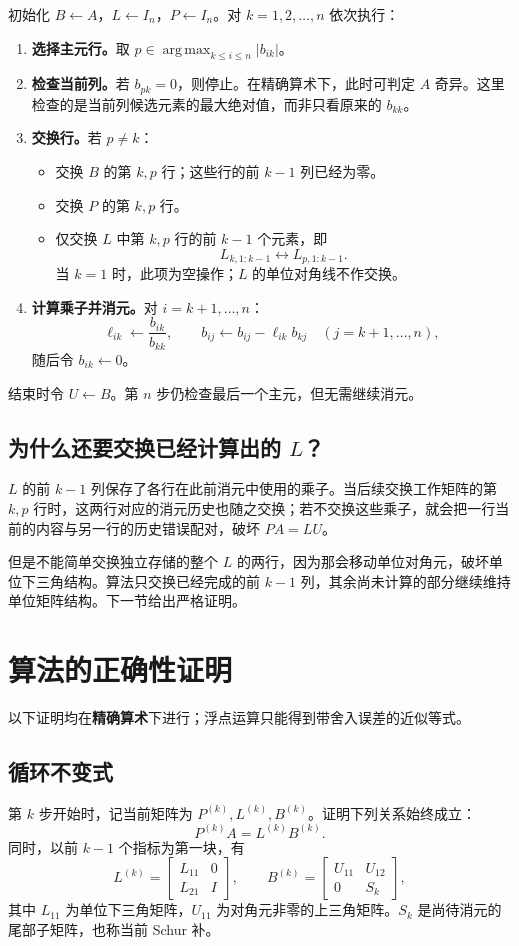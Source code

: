 \documentclass[UTF8,11pt,a4paper,fontset=fandol]{ctexart}
\newcommand{\mat}[1]{\begin{bmatrix}#1\end{bmatrix}}
\begin{document}
初始化 $B\gets A$，$L\gets I_n$，$P\gets I_n$。对 $k=1,2,\ldots,n$ 依次执行：
\begin{enumerate}[label=\textbf{Step \arabic*.},leftmargin=4.5em]
\item \textbf{选择主元行。}取 $p\in\operatorname{arg\,max}_{k\le i\le n}|b_{ik}|$。
\item \textbf{检查当前列。}若 $b_{pk}=0$，则停止。在精确算术下，此时可判定 $A$ 奇异。这里检查的是当前列候选元素的最大绝对值，而非只看原来的 $b_{kk}$。
\item \textbf{交换行。}若 $p\ne k$：
\begin{itemize}
\item 交换 $B$ 的第 $k,p$ 行；这些行的前 $k-1$ 列已经为零。
\item 交换 $P$ 的第 $k,p$ 行。
\item 仅交换 $L$ 中第 $k,p$ 行的前 $k-1$ 个元素，即
\[
L_{k,1:k-1}\longleftrightarrow L_{p,1:k-1}.
\]
当 $k=1$ 时，此项为空操作；$L$ 的单位对角线不作交换。
\end{itemize}
\item \textbf{计算乘子并消元。}对 $i=k+1,\ldots,n$：
\[
\ell_{ik}\gets\frac{b_{ik}}{b_{kk}},\qquad
b_{ij}\gets b_{ij}-\ell_{ik}b_{kj}\quad(j=k+1,\ldots,n),
\]
随后令 $b_{ik}\gets0$。
\end{enumerate}
结束时令 $U\gets B$。第 $n$ 步仍检查最后一个主元，但无需继续消元。

\subsection{为什么还要交换已经计算出的 $L$？}
$L$ 的前 $k-1$ 列保存了各行在此前消元中使用的乘子。当后续交换工作矩阵的第 $k,p$ 行时，这两行对应的消元历史也随之交换；若不交换这些乘子，就会把一行当前的内容与另一行的历史错误配对，破坏 $PA=LU$。

但是不能简单交换独立存储的整个 $L$ 的两行，因为那会移动单位对角元，破坏单位下三角结构。算法只交换已经完成的前 $k-1$ 列，其余尚未计算的部分继续维持单位矩阵结构。下一节给出严格证明。

\section{算法的正确性证明}
以下证明均在\textbf{精确算术}下进行；浮点运算只能得到带舍入误差的近似等式。

\subsection{循环不变式}
第 $k$ 步开始时，记当前矩阵为 $P^{(k)},L^{(k)},B^{(k)}$。证明下列关系始终成立：
\begin{equation}
\boxed{P^{(k)}A=L^{(k)}B^{(k)}}.
\label{eq:invariant}
\end{equation}
同时，以前 $k-1$ 个指标为第一块，有
\begin{equation}
L^{(k)}=\mat{L_{11}&0\\L_{21}&I},\qquad
B^{(k)}=\mat{U_{11}&U_{12}\\0&S_k},
\label{eq:blocks}
\end{equation}
其中 $L_{11}$ 为单位下三角矩阵，$U_{11}$ 为对角元非零的上三角矩阵。$S_k$ 是尚待消元的尾部子矩阵，也称当前 Schur 补。
\end{document}
